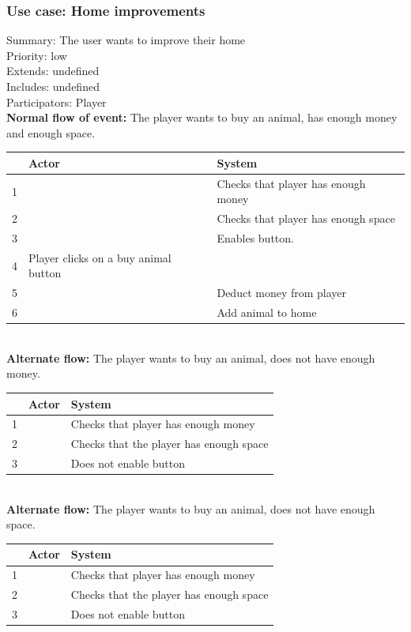 \documentclass{article}
\begin{document}
\subsubsection{Use case: Home improvements}
Summary: The user wants to improve their home\\
Priority: low \\
Extends: undefined\\
Includes: undefined\\
Participators: Player\\
\textbf{Normal flow of event:} The player wants to buy an animal, has enough money and enough space.
\vspace{1 mm}\\
\begin{tabular}{|c|l|l|} \hline
      & Actor & System \\ \hline
    1 & & Checks that player has enough money \\ \hline
    2 & & Checks that player has enough space \\ \hline
    3 & & Enables button. \\ \hline
    4 & Player clicks on a buy animal button & \\ \hline
    5 & & Deduct money from player \\ \hline
    6 & & Add animal to home \\ \hline
\end{tabular}  
\vspace{5 mm}\\
\textbf{Alternate flow:} The player wants to buy an animal, does not have enough money. 
\vspace{1 mm}\\
\begin{tabular}{|c|l|l|} \hline
      & Actor & System \\ \hline
    1 & & Checks that player has enough money \\ \hline
    2 & & Checks that the player has enough space \\ \hline
    3 & & Does not enable button \\ \hline
\end{tabular} 
\vspace{5 mm}\\
\textbf{Alternate flow:} The player wants to buy an animal, does not have enough space. 
\vspace{1 mm} \\
\begin{tabular}{|c|l|l|} \hline
      & Actor & System \\ \hline
    1 & & Checks that player has enough money \\ \hline
    2 & & Checks that the player has enough space \\ \hline
    3 & & Does not enable button \\ \hline
\end{tabular}  
\end{document}
